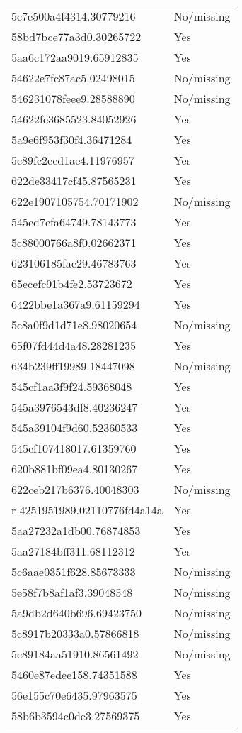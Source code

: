 \begin{tabular}{ll}
5c7e500a4f4314.30779216 & No/missing \\
58bd7bce77a3d0.30265722 & Yes \\
5aa6c172aa9019.65912835 & Yes \\
54622e7fc87ac5.02498015 & No/missing \\
546231078feee9.28588890 & No/missing \\
54622fe3685523.84052926 & Yes \\
5a9e6f953f30f4.36471284 & Yes \\
5c89fc2ecd1ae4.11976957 & Yes \\
622de33417cf45.87565231 & Yes \\
622e1907105754.70171902 & No/missing \\
545cd7efa64749.78143773 & Yes \\
5c88000766a8f0.02662371 & Yes \\
623106185fae29.46783763 & Yes \\
65ecefc91b4fe2.53723672 & Yes \\
6422bbe1a367a9.61159294 & Yes \\
5c8a0f9d1d71e8.98020654 & No/missing \\
65f07fd44d4a48.28281235 & Yes \\
634b239ff19989.18447098 & No/missing \\
545cf1aa3f9f24.59368048 & Yes \\
545a3976543df8.40236247 & Yes \\
545a39104f9d60.52360533 & Yes \\
545cf107418017.61359760 & Yes \\
620b881bf09ea4.80130267 & Yes \\
622ceb217b6376.40048303 & No/missing \\
r-4251951989.02110776fd4a14a & Yes \\
5aa27232a1db00.76874853 & Yes \\
5aa27184bff311.68112312 & Yes \\
5c6aae0351f628.85673333 & No/missing \\
5e58f7b8af1af3.39048548 & No/missing \\
5a9db2d640b696.69423750 & No/missing \\
5c8917b20333a0.57866818 & No/missing \\
5c89184aa51910.86561492 & No/missing \\
5460e87edee158.74351588 & Yes \\
56e155c70e6435.97963575 & Yes \\
58b6b3594c0dc3.27569375 & Yes \\

\end{tabular}

